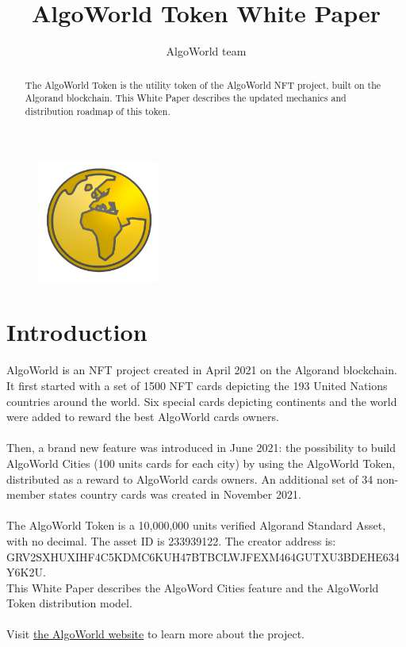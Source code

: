 \documentclass{article}
\title{AlgoWorld Token White Paper}
\author{AlgoWorld team}
\begin{document}
\maketitle

\begin{figure}[htp]
    \centering
    \includegraphics[width=4cm]{awt_logo.png}
\end{figure}

\begin{abstract}
The AlgoWorld Token is the utility token of the AlgoWorld NFT project, built on the Algorand blockchain. This White Paper describes the updated mechanics and distribution roadmap of this token.

\end{abstract}

\section{Introduction}
\label{sec:introduction}

AlgoWorld is an NFT project created in April 2021 on the Algorand blockchain. It first started with a set of 1500 NFT cards depicting the 193 United Nations countries around the world. Six special cards depicting continents and the world were added to reward the best AlgoWorld cards owners.
\\
\\
Then, a brand new feature was introduced in June 2021: the possibility to build AlgoWorld Cities (100 units cards for each city) by using the AlgoWorld Token, distributed as a reward to AlgoWorld cards owners. An additional set of 34 non-member states country cards was created in November 2021.
\\
\\
The AlgoWorld Token is a 10,000,000 units verified Algorand Standard Asset, with no decimal. The asset ID is 233939122.
The creator address is:
\\
GRV2SXHUXIHF4C5KDMC6KUH47BTBCLWJFEXM464GUTXU3BDEHE634Y6K2U.
\\
This White Paper describes the AlgoWord Cities feature and the AlgoWorld Token distribution model.
\\
\\
Visit \href{https://www.algoworld.io}{the AlgoWorld website} to learn more about the project.
\end{document}

